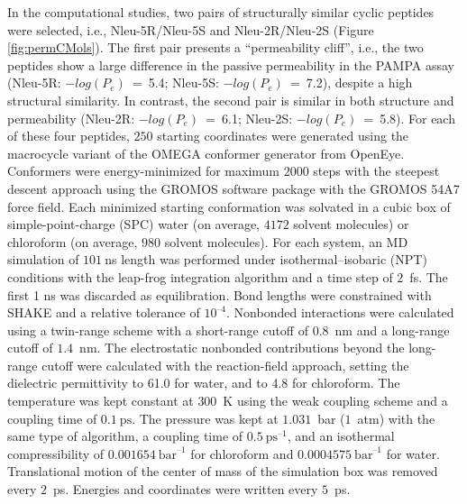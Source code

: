In the computational studies, two pairs of structurally similar cyclic peptides were selected, i.e., Nleu-5R/Nleu-5S and Nleu-2R/Nleu-2S (Figure \ref{fig:permCMols}). 
The first pair presents a ``permeability cliff'', i.e., the two peptides show a large difference in the passive permeability in the PAMPA assay (Nleu-5R: $−log(P_e)$~=~5.4; Nleu-5S: $−log(P_e)$~=~7.2), despite a high structural similarity. 
In contrast, the second pair is similar in both structure and permeability (Nleu-2R: $−log(P_e)$~=~6.1; Nleu-2S: $−log(P_e)$~=~5.8). 
For each of these four peptides, $250$ starting coordinates were generated using the macrocycle variant of the OMEGA conformer generator from OpenEye. \cite{Hawkins2012, Hawkins2010, Poongavanam2018}
Conformers were energy-minimized for maximum $2000$ steps with the steepest descent \cite{Ruder2016} approach using the GROMOS software package \cite{Schmid2012} with the GROMOS 54A7 force field. \cite{Schmid2011} 
Each minimized starting conformation was solvated in a cubic box of simple-point-charge (SPC) water \cite{Berendsen1981} (on average, $4172$ solvent molecules) or chloroform \cite{Tironi1994} (on average, $980$ solvent molecules). 
For each system, an MD simulation of $101~$ns length was performed under isothermal–isobaric (NPT) conditions with the leap-frog integration algorithm \cite{Hockney1970, Gunsteren1988} and a time step of $2$~fs. 
The first 1 ns was discarded as equilibration. Bond lengths were constrained with SHAKE \cite{Ryckaert1977} and a relative tolerance of $10^{–4}$. 
Nonbonded interactions were calculated using a twin-range scheme with a short-range cutoff of $0.8$~nm and a long-range cutoff of $1.4$~nm. 
The electrostatic nonbonded contributions beyond the long-range cutoff were calculated with the reaction-field \cite{Tironi1995} approach, setting the dielectric permittivity to 61.0 \cite{Heinz2001} for water, and to 4.8 \cite{Tironi1994} for chloroform. 
The temperature was kept constant at $300$~K using the weak coupling scheme \cite{Berendsen1984} and a coupling time of $0.1~\text{ps}$. 
The pressure was kept at $1.031$~bar ($1$~atm) with the same type of algorithm, a coupling time of $0.5~\text{ps}^{–1}$, and an isothermal compressibility of $0.001654~\text{bar}^{–1}$ for chloroform and $0.0004575~\text{bar}^{–1}$ for water. 
Translational motion of the center of mass of the simulation box was removed every $2$~ps. Energies and coordinates were written every $5$~ps.

